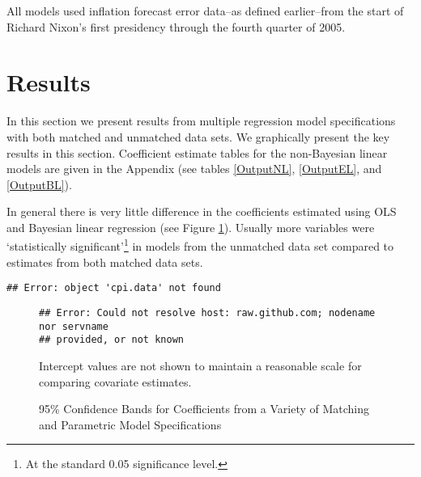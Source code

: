 \documentclass[a4paper]{article}\usepackage{graphicx, color}
\makeatletter
\newenvironment{kframe}{%
 \def\FrameCommand##1{\hskip\@totalleftmargin \hskip-\fboxsep
 \colorbox{shadecolor}{##1}\hskip-\fboxsep
     \hskip-\linewidth \hskip-\@totalleftmargin \hskip\columnwidth}%
 \MakeFramed {\advance\hsize-\width
   \@totalleftmargin\z@ \linewidth\hsize
   \@setminipage}}%
 {\par\unskip\endMakeFramed}
\newenvironment{knitrout}{}{} %
\makeatother
\begin{document}
All models used inflation forecast error data--as defined earlier--from the start of Richard Nixon's first presidency through the fourth quarter of 2005. 

\section{Results}

In this section we present results from multiple regression model specifications with both matched and unmatched data sets. We graphically present the key results in this section. Coefficient estimate tables for the non-Bayesian linear models are given in the Appendix (see tables \ref{OutputNL}, \ref{OutputEL}, and \ref{OutputBL}).

In general there is very little difference in the coefficients estimated using OLS and Bayesian linear regression (see Figure \ref{CoefComparePlots}). Usually more variables were `statistically significant'\footnote{At the standard 0.05 significance level.} in models from the unmatched data set compared to estimates from both matched data sets.

\begin{knitrout}
\color{fgcolor}\begin{kframe}
\begin{verbatim}
## Error: object 'cpi.data' not found
\end{verbatim}
\end{kframe}
\end{knitrout}


\begin{figure}[t]
    \caption{95\% Confidence Bands for Coefficients from a Variety of Matching and Parametric Model Specifications}
    \label{CoefComparePlots}
    \begin{center}

\begin{knitrout}
\color{fgcolor}\begin{kframe}
\begin{verbatim}
## Error: Could not resolve host: raw.github.com; nodename nor servname
## provided, or not known
\end{verbatim}
\end{kframe}
\end{knitrout}

    \end{center}
    \begin{singlespace}
        {\scriptsize{Intercept values are not shown to maintain a reasonable scale for comparing covariate estimates.}}
    \end{singlespace}
\end{figure}
\end{document}
